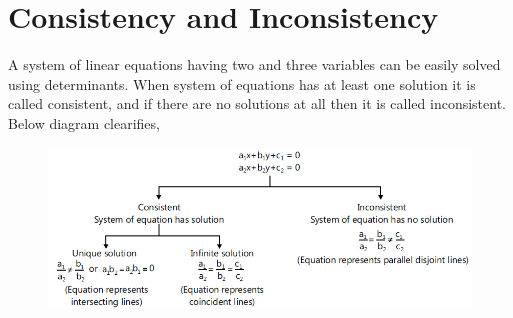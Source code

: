 \documentclass{article}
\begin{document}
\section{Consistency and Inconsistency}
A system of linear equations having two and three variables can be easily solved using determinants. When system of equations has at least one solution it is called consistent, and if there are no solutions at all then it is called inconsistent. Below diagram clearifies,
\begin{figure}[H]
    \centering
    \includegraphics[scale=0.5]{determinants_lec4_notes-1.png}
\end{figure}
\end{document}
